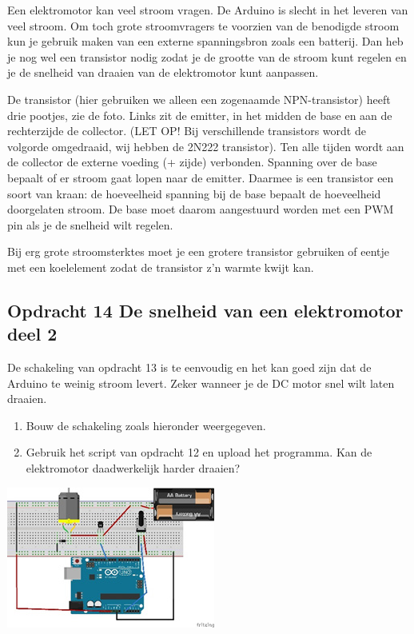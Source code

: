 \documentclass{arduino}
\begin{document}

Een elektromotor kan veel stroom vragen. De Arduino is slecht in het leveren van veel stroom. Om toch grote stroomvragers te voorzien van de benodigde stroom kun je gebruik maken van een externe spanningsbron zoals een batterij. Dan heb je nog wel een transistor nodig zodat je de grootte van de stroom kunt regelen en je de snelheid van draaien van de elektromotor kunt aanpassen.

De transistor (hier gebruiken we alleen een zogenaamde NPN-transistor) heeft drie pootjes, zie de foto. Links zit de emitter, in het midden de base en aan de rechterzijde de collector. (LET OP! Bij verschillende transistors wordt de volgorde omgedraaid, wij hebben de 2N222 transistor). Ten alle tijden wordt aan de collector de externe voeding (+ zijde) verbonden. Spanning over de base bepaalt of er stroom gaat lopen naar de emitter. Daarmee is een transistor een soort van kraan: de hoeveelheid spanning bij de base bepaalt de hoeveelheid doorgelaten stroom. De base moet daarom aangestuurd worden met een PWM pin als je de snelheid wilt regelen.

Bij erg grote stroomsterktes moet je een grotere transistor gebruiken of eentje met een koelelement zodat de transistor z’n warmte kwijt kan.

\subsection{Opdracht 14 De snelheid van een elektromotor deel 2}

De schakeling van opdracht 13 is te eenvoudig en het kan goed zijn dat de Arduino te weinig stroom levert. Zeker wanneer je de DC motor snel wilt laten draaien.

\begin{enumerate}[label={\alph*})]
\item Bouw de schakeling zoals hieronder weergegeven.

\item Gebruik het script van opdracht 12 en upload het programma. Kan de elektromotor daadwerkelijk harder draaien?
\end{enumerate}

\begin{center}
\includegraphics[width=0.8\linewidth]{33. Circuit motor control (large current)}
\end{center}
\end{document}
